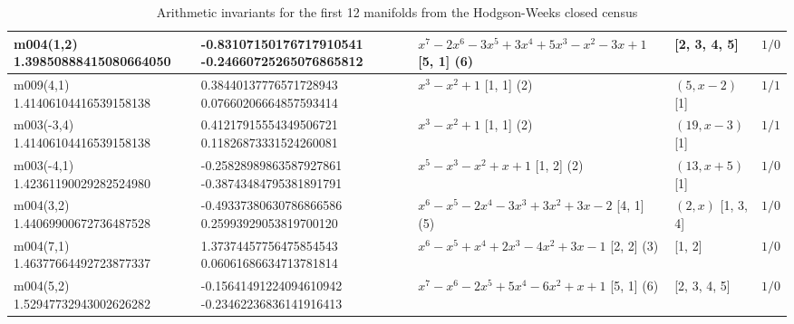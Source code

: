 \documentclass[a4paper]{amsart}
\newcommand{\PreserveBackslash}[1]{\let\temp =\\#1\let\\=\temp}
\theoremstyle{definition}
\begin{document}
\begin{sidewaystable}
\begin{tabular}{|>{\PreserveBackslash\raggedright}p{4.2cm}| %
>{\PreserveBackslash\raggedright}p{4.2cm}|
	>{\PreserveBackslash\raggedright}p{6cm}|
	>{\PreserveBackslash\raggedright}p{2.4cm}|l|}
m004(1,2)
1.39850888415080664050 &
-0.83107150176717910541 
-0.24660725265076865812 &
\hbox{$x^7 - 2x^6 - 3x^5 + 3x^4 + 5x^3 - x^2 - 3x + 1$} [5, 1] (6) &
[2, 3, 4, 5] &
$1/0$ \\



\hline 

m009(4,1)
1.41406104416539158138 &
0.38440137776571728943 
0.07660206664857593414 &
\hbox{$x^3 - x^2 + 1$} [1, 1] (2) &
\hbox{$(5, x-2)$} [1]&
$1/1$ \\


\hline 

m003(-3,4)
1.41406104416539158138 &
0.41217915554349506721 
0.11826873331524260081 &
\hbox{$x^3 - x^2 + 1$} [1, 1] (2) &
\hbox{$(19, x-3)$} [1]&
$1/1$ \\



\hline 

m003(-4,1)
1.42361190029282524980 &
-0.25828989863587927861 
-0.38743484795381891791 &
\hbox{$x^5 - x^3 - x^2 + x + 1$} [1, 2] (2) &
\hbox{$(13, x+5)$} [1]&
$1/0$ \\



\hline 

m004(3,2)
1.44069900672736487528 &
-0.49337380630786866586 
0.25993929053819700120 &
\hbox{$x^6 - x^5 - 2x^4 - 3x^3 + 3x^2 + 3x - 2$} [4, 1] (5) &
\hbox{$(2,x)$} [1, 3, 4] &
$1/0$ \\



\hline 

m004(7,1)
1.46377664492723877337 &
1.37374457756475854543 
0.06061686634713781814 &
\hbox{$x^6 - x^5 + x^4 + 2x^3 - 4x^2 + 3x - 1$} [2, 2] (3) &
[1, 2] &
$1/0$ \\


\hline 

m004(5,2)
1.52947732943002626282 &
-0.15641491224094610942 
-0.23462236836141916413 &
\hbox{$x^7 - x^6 - 2x^5 + 5x^4 - 6x^2 + x + 1$} [5, 1] (6) &
[2, 3, 4, 5] &
$1/0$ \\

\hline 

\end{tabular}
\caption{Arithmetic invariants for the first 12 manifolds
from the Hodgson-Weeks closed census}
\label{lowvolclosed}
\end{sidewaystable}
\end{document}
